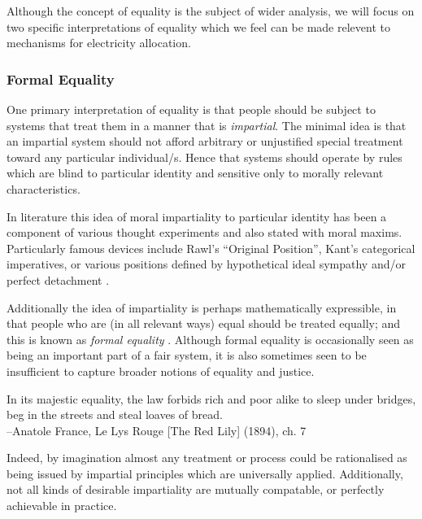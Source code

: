 Although the concept of equality is the subject of wider analysis, we will focus on two specific interpretations of equality which we feel can be made relevent to mechanisms for electricity allocation.

\subsubsection{Formal Equality}

One primary interpretation of equality is that people should be subject to systems that treat them in a manner that is \textit{impartial}. The minimal idea is that an impartial system should not afford arbitrary or unjustified special treatment toward any particular individual/s. Hence that systems should operate by rules which are blind to particular identity and sensitive only to morally relevant characteristics.

In literature this idea of moral impartiality to particular identity has been a component of various thought experiments and also stated with moral maxims.
Particularly famous devices include Rawl's ``Original Position'', Kant's categorical imperatives, or various positions defined by hypothetical ideal sympathy and/or perfect detachment \cite{smithGutenberg, nla.cat-vn197822,10.2307/2103988}.

Additionally the idea of impartiality is perhaps mathematically expressible, in that people who are (in all relevant ways) equal should be treated equally; and this is known as \textit{formal equality} \cite{whatisbasicequalitynathan}. Although formal equality is occasionally seen as being an important part of a fair system, it is also sometimes seen to be insufficient to capture broader notions of equality and justice.

\begin{displayquote}
In its majestic equality, the law forbids rich and poor alike to sleep under bridges, beg in the streets and steal loaves of bread.\\
--Anatole France, Le Lys Rouge [The Red Lily] (1894), ch. 7
\end{displayquote}

Indeed, by imagination almost any treatment or process could be rationalised as being issued by impartial principles which are universally applied. Additionally, not all kinds of desirable impartiality are mutually compatable, or perfectly achievable in practice.\cite{Hutchinson_2019}

